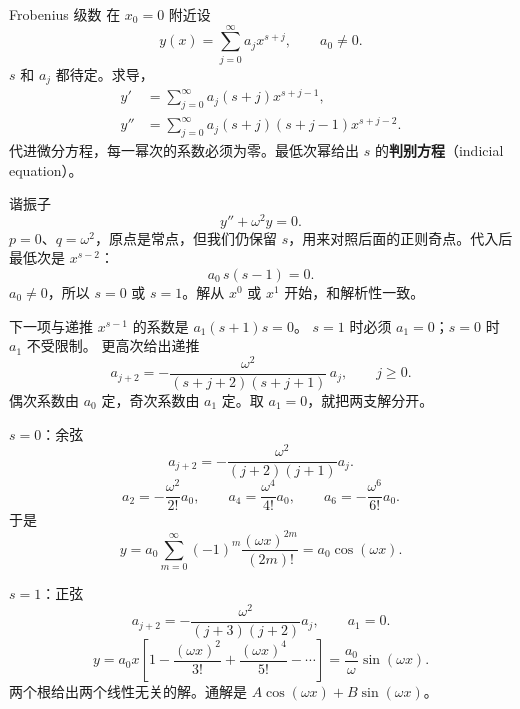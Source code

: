 \documentclass[fontset=windows, chinese, 10pt, xcolor=dvipsnames]{beamer}
\begin{document}
\begin{frame}{Frobenius 级数}
  在 $x_0=0$ 附近设
  \begin{equation*}
    y(x)=\sum_{j=0}^{\infty}a_j x^{s+j},\qquad a_0\neq 0.
  \end{equation*}
  $s$ 和 $a_j$ 都待定。求导，
  \begin{align*}
    y'&=\sum_{j=0}^{\infty}a_j(s+j)x^{s+j-1},\\
    y''&=\sum_{j=0}^{\infty}a_j(s+j)(s+j-1)x^{s+j-2}.
  \end{align*}
  代进微分方程，每一幂次的系数必须为零。最低次幂给出 $s$ 的\textbf{判别方程}（indicial equation）。
\end{frame}

\begin{frame}{谐振子}
  \[
    y''+\omega^2 y=0.
  \]
  $p=0$、$q=\omega^2$，原点是常点，但我们仍保留 $s$，用来对照后面的正则奇点。代入后最低次是 $x^{s-2}$：
  \[
    a_0\,s(s-1)=0.
  \]
  $a_0\neq 0$，所以 $s=0$ 或 $s=1$。解从 $x^0$ 或 $x^1$ 开始，和解析性一致。
\end{frame}

\begin{frame}{下一项与递推}
  $x^{s-1}$ 的系数是 $a_1(s+1)s=0$。
  $s=1$ 时必须 $a_1=0$；$s=0$ 时 $a_1$ 不受限制。
  \vspace{0.3em}
  更高次给出递推
  \begin{equation*}
    a_{j+2}=-\frac{\omega^2}{(s+j+2)(s+j+1)}\,a_j,
    \qquad j\geq 0.
  \end{equation*}
  偶次系数由 $a_0$ 定，奇次系数由 $a_1$ 定。取 $a_1=0$，就把两支解分开。
\end{frame}

\begin{frame}{$s=0$：余弦}
  \[
    a_{j+2}=-\frac{\omega^2}{(j+2)(j+1)}a_j.
  \]
  \[
    a_2=-\frac{\omega^2}{2!}a_0,\qquad
    a_4=\frac{\omega^4}{4!}a_0,\qquad
    a_6=-\frac{\omega^6}{6!}a_0.
  \]
  于是
  \[
    y=a_0\sum_{m=0}^{\infty}(-1)^m\frac{(\omega x)^{2m}}{(2m)!}
    =a_0\cos(\omega x).
  \]
\end{frame}

\begin{frame}{$s=1$：正弦}
  \[
    a_{j+2}=-\frac{\omega^2}{(j+3)(j+2)}a_j,\qquad a_1=0.
  \]
  \[
    y=a_0 x\left[
      1-\frac{(\omega x)^2}{3!}
       +\frac{(\omega x)^4}{5!}
       -\cdots
    \right]
    =\frac{a_0}{\omega}\sin(\omega x).
  \]
  两个根给出两个线性无关的解。通解是 $A\cos(\omega x)+B\sin(\omega x)$。
\end{frame}
\end{document}
